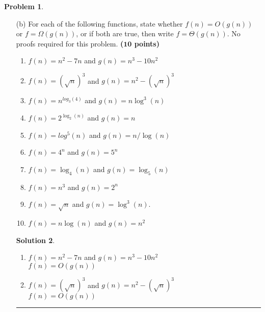 \documentclass{article}
\theoremstyle{definition}
\newtheorem{problem}{Problem}
\def\fline{\rule{0.75\linewidth}{0.5pt}}
\newcommand{\finishline}{\begin{center}\fline\end{center}}
\newtheorem*{solution*}{Solution}
\newenvironment{solution}{\begin{solution*}}{{\finishline} \end{solution*}}
\newcommand{\grade}[1]{\hfill{\textbf{($\mathbf{#1}$ points)}}}
\begin{document}
\begin{problem}
\begin{enumerate}
\begin{solution}
\begin{itemize}
		\item For $f(n) = 2^{2^n}$: 
		\begin{itemize}
		    \item $f(n) \neq \Theta(f(n-1))$: False \\
		    Proof: \\
		    \item $f(n) = \Theta(f(n/2))$: False \\
		    Proof: $2^{2^n} / 2^{2^{(n/2)}} = 2^{2^n - 2^{(n/2)}}$ grows unbounded.
		    \item $f(n) = \Theta(f(\sqrt{n}))$: False \\
		    Proof: $2^{2^n} / 2^{2^{\sqrt{n}}}$ grows even faster.
		\end{itemize}
	    \end{itemize} 
	\end{solution}


\item[(b)] For each of the following functions, state whether $f(n) = O(g(n))$ or $f = \Omega(g(n))$, or if both are true, then write $f = \Theta(g(n))$. No proofs required for this problem.  \grade{10}
\begin{enumerate}
	\item $f(n) = n^2 - 7n$ and $g(n) = n^3 - 10n^2$
	\item $f(n) = (\sqrt{n})^3$ and $g(n) = n^2 - (\sqrt{n})^3$
	\item $f(n) = n^{log_3(4)}$ and $g(n) = n\log^3(n)$
	\item $f(n) = 2^{\log_2(n)}$ and $g(n) = n$
	\item $f(n) = log^5(n)$ and $g(n) = n/\log(n)$
	\item $f(n) = 4^n$ and $g(n) = 5^n$
	\item $f(n) = \log_4(n)$ and $g(n) = \log_5(n)$
	\item $f(n) = n^3$ and $g(n) = 2^{n}$
	\item $f(n) = \sqrt{n}$ and $g(n) = \log^3(n)$. 
	\item $f(n) = n\log(n)$ and $g(n) = n^2$

\end{enumerate}

   
    \begin{solution}
	\begin{enumerate}[label=(\alph*)]
		\item $f(n) = n^2 - 7n$ and $g(n) = n^3 - 10n^2$ \\
		$f(n) = O(g(n))$
		
		\item $f(n) = (\sqrt{n})^3$ and $g(n) = n^2 - (\sqrt{n})^3$ \\
		$f(n) = O(g(n))$
		

\end{enumerate}
\end{solution}
\end{enumerate}
\end{problem}
\end{document}
